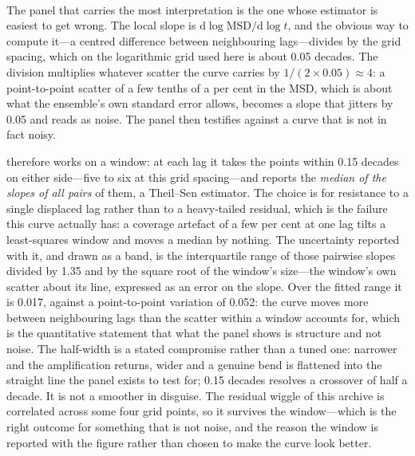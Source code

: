 \paragraph{}
\begin{revblock}
The panel that carries the most interpretation is the one whose estimator is easiest
to get wrong. The local slope is $\mathrm{d}\log\mathrm{MSD}/\mathrm{d}\log t$, and the
obvious way to compute it---a centred difference between neighbouring lags---divides by
the grid spacing, which on the logarithmic grid used here is about \num{0.05} decades.
The division multiplies whatever scatter the curve carries by $1/(2\times0.05)\approx4$:
a point-to-point scatter of a few tenths of a per cent in the MSD, which is about what the
ensemble's own standard error allows, becomes a slope that jitters by \num{0.05} and reads
as noise. The panel then testifies against a curve that is not in fact noisy.

 therefore works on a window: at each lag it
takes the points within \num{0.15} decades on either side---five to six at this grid
spacing---and reports the \emph{median of the slopes of all pairs} of them, a Theil--Sen
estimator. The choice is for resistance to a single displaced lag rather than to a
heavy-tailed residual, which is the failure this curve actually has: a coverage artefact
of a few per cent at one lag tilts a least-squares window and moves a median by nothing.
The uncertainty reported with it, and drawn as a band, is the interquartile range of those
pairwise slopes divided by \num{1.35} and by the square root of the window's size---the
window's own scatter about its line, expressed as an error on the slope. Over the fitted
range it is \num{0.017}, against a point-to-point variation of \num{0.052}: the curve
moves more between neighbouring lags than the scatter within a window accounts for, which
is the quantitative statement that what the panel shows is structure and not noise. The
half-width is a stated compromise rather than a tuned one: narrower and the amplification
returns, wider and a genuine bend is flattened into the straight line the panel exists to
test for; \num{0.15} decades resolves a crossover of half a decade. It is not a smoother
in disguise. The residual wiggle of this archive is correlated across some four grid
points, so it survives the window---which is the right outcome for something that is not
noise, and the reason the window is reported with the figure rather than chosen to make
the curve look better.
\end{revblock}

